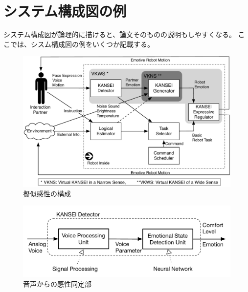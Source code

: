 \documentclass[a4paper,11pt,oneside,openany]{jsbook}
\begin{document}
\chapter{システム構成図の例}
システム構成図が論理的に描けると、論文そのものの説明もしやすくなる。
ここでは、シスム構成図の例をいくつか記載する。
\begin{figure}[h]
  \centering
  \includegraphics[width=12cm]{VKall.pdf}
  \vspace{-1mm}
  \caption{擬似感性の構成}
  \label{fig:vkall}
  \vspace{5mm}
\end{figure}

\begin{figure}[h]
  \centering
  \includegraphics[width=14cm]{VoiceKANSEIDetector.pdf}
  \vspace{-1mm}
  \caption{音声からの感性同定部}
  \label{fig:VoiceKANSEIDetector}
  \vspace{5mm}
\end{figure}
%
\end{document}
